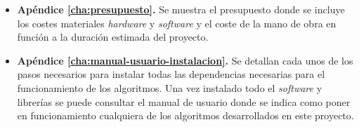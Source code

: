 \begin{itemize}
    \item \textbf{Apéndice \ref{cha:presupuesto}.} Se muestra el presupuesto donde se incluye los costes materiales \textit{hardware} y \textit{software} y el coste de la mano de obra en función a la duración estimada del proyecto.
    \item \textbf{Apéndice \ref{cha:manual-usuario-instalacion}.} Se detallan cada unos de los pasos necesarios para instalar todas las dependencias necesarias para el funcionamiento de los algoritmos. Una vez instalado todo el \textit{software} y librerías se puede consultar el manual de usuario donde se indica como poner en funcionamiento cualquiera de los algoritmos desarrollados en este proyecto.
\end{itemize}




